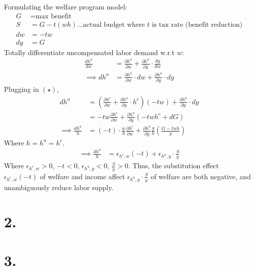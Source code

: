 \documentclass[
]{article}
\begin{document}
\begin{enumerate}
Formulating the welfare program model:  
\[\begin{aligned}
G &= \text{max benefit}  \\
S &= G - t(wh) \dots \text{actual budget where $t$ is tax rate (benefit reduction)} \\
dw &= -tw \\
dy &= G
\end{aligned}\]
Totally differentiate uncompensated labor demand w.r.t $w$:
\[\begin{aligned}
\frac{d h^u}{dw} &= \frac{\partial h ^u}{\partial w} + \frac{\partial h ^u}{\partial y}\cdot \frac{dy}{dw} \\
\implies dh^u &=\frac{\partial h ^u}{\partial w}\cdot dw + \frac{\partial h ^u}{\partial y}\cdot dy
\end{aligned}\]
Plugging in $(\star)$, 
\[\begin{aligned}
dh^u &= (\frac{\partial h^c}{\partial w} + \frac{\partial h^u}{\partial y} \cdot h^c)(-tw) + \frac{\partial h ^u}{\partial y}\cdot dy \\
&= -tw\frac{\partial h^c}{\partial w} + \frac{\partial h^u}{\partial y}(-twh^c + dG) \\
\implies \frac{dh^u}{h} &= (-t)\cdot\frac{w}{h}\frac{\partial h^c}{\partial w} + \frac{\partial h^u}{\partial y}\frac{y}{h}(\frac{G-twh}{y})
\end{aligned}\]
Where $h = h^u = h^c$. 
\[\begin{aligned}
\implies \frac{dh^u}{h} &= \epsilon_{h^c,w}(-t) + \epsilon_{h^u, y} \cdot \frac{S}{y}
\end{aligned}\]
Where $\epsilon_{h^c,w} > 0$, $-t < 0$, $\epsilon_{h^u, y} < 0$, $\frac{S}{y} > 0$. Thus, the substitution effect $\epsilon_{h^c,w}(-t)$ of welfare and income affect $\epsilon_{h^u, y} \cdot \frac{S}{y}$ of welfare are both negative, and unambiguously reduce labor supply.

\end{enumerate}

\hypertarget{section}{%
\section{2.}\label{section}}

\break

\hypertarget{section-1}{%
\section{3.}\label{section-1}}
\end{document}
